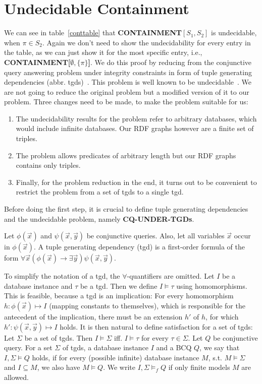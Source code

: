 \section{Undecidable Containment}
We can see in table~\ref{conttable} that
\textbf{CONTAINMENT$[S_1,S_2]$} is undecidable, when $\pi \in S_2$. Again we don't need to show
the undecidability for every entry in the table, as we can just show it for the
most specific entry, i.e.,
\textbf{CONTAINMENT[$\emptyset,\{\pi\}$]}. We do this proof by
reducing from the conjunctive query answering problem under integrity 
constraints in form of tuple generating dependencies (abbr. tgds)~\cite{JOHNSON1984167,cali2008taming}. This problem
is well known to be undecidable~\cite{JOHNSON1984167,cali2008taming}. We are not going to reduce the original problem but a modified version of it to our problem. 
Three changes need to be made, to make the problem suitable for us:
\begin{enumerate}
	\item  The undecidability results for the problem refer to arbitrary
		databases, which would include infinite databases. Our RDF graphs
		however are a finite set of triples.
	\item The problem allows predicates of arbitrary length but our RDF graphs
		contains only triples. 
	\item Finally, for the problem reduction in the end, it turns out to be
		convenient to restrict the problem from a set of tgds to a single tgd.
\end{enumerate}

Before doing the first step, it is crucial to define tuple generating dependencies 
and the undecidable problem, namely \textbf{CQ-UNDER-TGDs}.

\begin{definition}
	Let $\phi(\vec{x})$ and $\psi(\vec{x},\vec{y})$ be conjunctive queries.
	Also, let all variables $\vec{x}$ occur in $\phi(\vec{x})$.
	A tuple generating dependency (tgd) is a first-order formula of the form 
	$\forall \vec{x} (\phi(\vec{x}) \rightarrow \exists \vec{y})
	\psi(\vec{x},\vec{y})$.
\end{definition}
To simplify the notation of a tgd, the $\forall$-quantifiers are omitted.
Let $I$ be a database instance and $\tau$ be a tgd. Then we define $I \models
\tau$ %
using homomorphisms. This is feasible, because a tgd is an implication:
For every homomorphism $h: \phi(\vec{x}) \mapsto I$ (mapping constants to
themselves), which is responsible for the antecedent of the implication, there
must be an extension $h'$ of $h$, for which $h':\psi(\vec{x},\vec{y}) \mapsto I$
holds. It is then natural to define satisfaction for a set of tgds: Let $\Sigma$
be a set of tgds. Then $I \models \Sigma$ iff. $I \models \tau$ for every $\tau
\in \Sigma$.
Let $Q$ be conjunctive query. For a set $\Sigma$ of tgds, a database instance
$I$ and a BCQ $Q$, we say that $I,\Sigma \models Q$ holds, if for every
(possible infinite) database instance $M$, s.t. $M \models \Sigma$ and $I
\subseteq M$, we also have $M \models Q$. We write $I, \Sigma \models_f Q$ if
only finite models $M$ are allowed.

